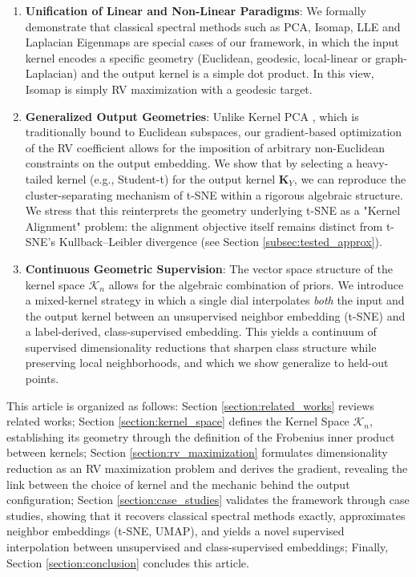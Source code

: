 \documentclass[11pt]{article}
\begin{document}
	\begin{enumerate}
		\item \textbf{Unification of Linear and Non-Linear Paradigms}: We formally demonstrate that classical spectral methods such as PCA, Isomap, LLE and Laplacian Eigenmaps are special cases of our framework, in which the input kernel encodes a specific geometry (Euclidean, geodesic, local-linear or graph-Laplacian) and the output kernel is a simple dot product. In this view, Isomap is simply RV maximization with a geodesic target.
		\item \textbf{Generalized Output Geometries}: Unlike Kernel PCA \citep{scholkopf_nonlinear_1998}, which is traditionally bound to Euclidean subspaces, our gradient-based optimization of the RV coefficient allows for the imposition of arbitrary non-Euclidean constraints on the output embedding. We show that by selecting a heavy-tailed kernel (e.g., Student-t) for the output kernel $\mathbf{K}_Y$, we can reproduce the cluster-separating mechanism of t-SNE within a rigorous algebraic structure. We stress that this reinterprets the geometry underlying t-SNE as a "Kernel Alignment" problem: the alignment objective itself remains distinct from t-SNE's Kullback--Leibler divergence (see Section \ref{subsec:tested_approx}).
		\item \textbf{Continuous Geometric Supervision}: The vector space structure of the kernel space $\mathcal{K}_n$ allows for the algebraic combination of priors. We introduce a mixed-kernel strategy in which a single dial interpolates \emph{both} the input and the output kernel between an unsupervised neighbor embedding (t-SNE) and a label-derived, class-supervised embedding. This yields a continuum of supervised dimensionality reductions that sharpen class structure while preserving local neighborhoods, and which we show generalize to held-out points.
	\end{enumerate}	
	
	This article is organized as follows: Section \ref{section:related_works} reviews related works; Section \ref{section:kernel_space} defines the Kernel Space $\mathcal{K}_n$, establishing its geometry through the definition of the Frobenius inner product between kernels; Section \ref{section:rv_maximization} formulates dimensionality reduction as an RV maximization problem and derives the gradient, revealing the link between the choice of kernel and the mechanic behind the output configuration; Section \ref{section:case_studies} validates the framework through case studies, showing that it recovers classical spectral methods exactly, approximates neighbor embeddings (t-SNE, UMAP), and yields a novel supervised interpolation between unsupervised and class-supervised embeddings; Finally, Section \ref{section:conclusion} concludes this article.
	
\end{document}
